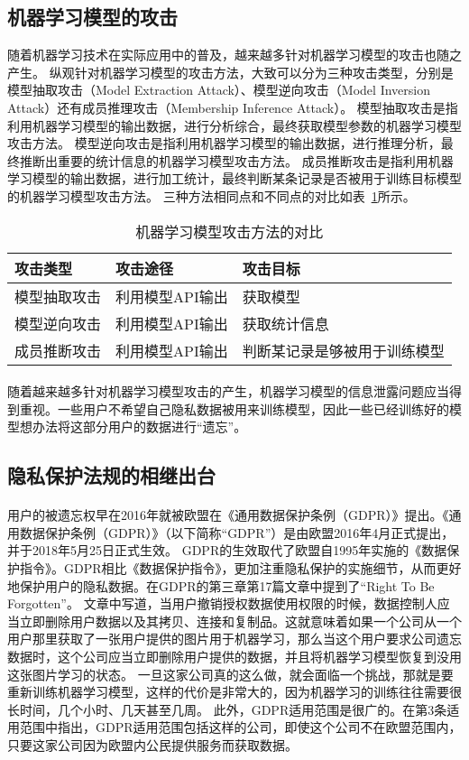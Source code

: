 \subsection{机器学习模型的攻击}
随着机器学习技术在实际应用中的普及，越来越多针对机器学习模型的攻击也随之产生。
纵观针对机器学习模型的攻击方法，大致可以分为三种攻击类型，分别是模型抽取攻击（Model Extraction Attack）、模型逆向攻击（Model Inversion Attack）还有成员推理攻击（Membership Inference Attack）。
模型抽取攻击是指利用机器学习模型的输出数据，进行分析综合，最终获取模型参数的机器学习模型攻击方法。
模型逆向攻击是指利用机器学习模型的输出数据，进行推理分析，最终推断出重要的统计信息的机器学习模型攻击方法。
成员推断攻击是指利用机器学习模型的输出数据，进行加工统计，最终判断某条记录是否被用于训练目标模型的机器学习模型攻击方法。
三种方法相同点和不同点的对比如表~\ref{tab:model-attack-difference}所示。
\begin{table}
    \centering
    \caption{机器学习模型攻击方法的对比}
    \begin{tabular}{lll}
      \toprule
      攻击类型  & 攻击途径 & 攻击目标  \\
      \midrule
      模型抽取攻击   & 利用模型API输出 & 获取模型 \\
      模型逆向攻击   & 利用模型API输出 & 获取统计信息                    \\
      成员推断攻击 & 利用模型API输出  & 判断某记录是够被用于训练模型  \\
      \bottomrule
    \end{tabular}
    \label{tab:model-attack-difference}
\end{table}
\paragraph{}随着越来越多针对机器学习模型攻击的产生，机器学习模型的信息泄露问题应当得到重视。一些用户不希望自己隐私数据被用来训练模型，因此一些已经训练好的模型想办法将这部分用户的数据进行“遗忘”。
\subsection{隐私保护法规的相继出台}
\paragraph{}用户的被遗忘权早在2016年就被欧盟在《通用数据保护条例（GDPR）》提出。《通用数据保护条例（GDPR）》（以下简称“GDPR”）是由欧盟2016年4月正式提出，并于2018年5月25日正式生效。
GDPR的生效取代了欧盟自1995年实施的《数据保护指令》。GDPR相比《数据保护指令》，更加注重隐私保护的实施细节，从而更好地保护用户的隐私数据。在GDPR的第三章第17篇文章中提到了“Right To Be Forgotten”。
文章中写道，当用户撤销授权数据使用权限的时候，数据控制人应当立即删除用户数据以及其拷贝、连接和复制品。这就意味着如果一个公司从一个用户那里获取了一张用户提供的图片用于机器学习，那么当这个用户要求公司遗忘数据时，这个公司应当立即删除用户提供的数据，并且将机器学习模型恢复到没用这张图片学习的状态。
一旦这家公司真的这么做，就会面临一个挑战，那就是要重新训练机器学习模型，这样的代价是非常大的，因为机器学习的训练往往需要很长时间，几个小时、几天甚至几周。
此外，GDPR适用范围是很广的。在第3条适用范围中指出，GDPR适用范围包括这样的公司，即使这个公司不在欧盟范围内，只要这家公司因为欧盟内公民提供服务而获取数据。
